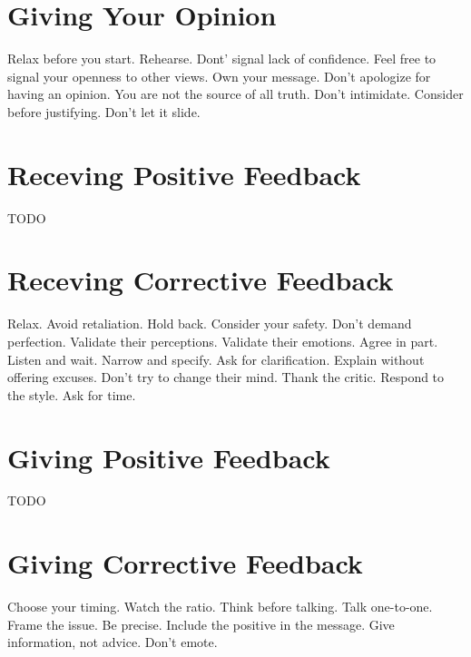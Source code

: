 \documentclass{article}
\begin{document}
\begin{multicols}{2}

	\section{Giving Your Opinion}

    Relax before you start.
    Rehearse.
    Dont' signal lack of confidence.
    Feel free to signal your openness to other views.
    Own your message.
    Don't apologize for having an opinion.
    You are not the source of all truth.
    Don't intimidate.
    Consider before justifying.
    Don't let it slide.
    
	\section{Receving Positive Feedback}

    TODO

	\section{Receving Corrective Feedback}

    Relax.
    Avoid retaliation.
    Hold back.
    Consider your safety.
    Don't demand perfection.
    Validate their perceptions.
    Validate their emotions.
    Agree in part.
    Listen and wait.
    Narrow and specify. 
    Ask for clarification. 
    Explain without offering excuses.
    Don't try to change their mind. 
    Thank the critic.
    Respond to the style.
    Ask for time.
    
\columnbreak

	\section{Giving Positive Feedback}

    TODO

	\section{Giving Corrective Feedback}

    Choose your timing.
    Watch the ratio.
    Think before talking.
    Talk one-to-one.
    Frame the issue.
    Be precise.
    Include the positive in the message.
    Give information, not advice.
    Don't emote.

\end{multicols}
\end{document}
